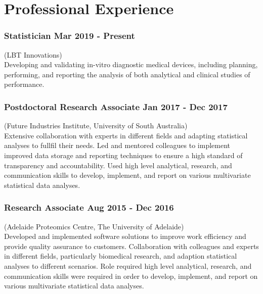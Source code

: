 \documentclass[a4paper,12pt]{report}
\begin{document}
\vspace{1cm}
\section*{Professional Experience}

\subsubsection*{Statistician  \hfill Mar 2019 - Present} \vspace{-6pt}
(LBT Innovations) \\[4pt]

Developing and validating in-vitro diagnostic medical devices, including planning, performing, 
and reporting the analysis of both analytical and clinical studies of performance.

\subsubsection*{Postdoctoral Research Associate  \hfill Jan 2017 - Dec 2017} \vspace{-6pt}
(Future Industries Institute, University of South Australia) \\[4pt]

Extensive collaboration with experts in different fields and adapting statistical
analyses to fullfil their needs. Led and mentored colleagues to implement
improved data storage and reporting techniques to ensure a high standard of transparency
and accountability. Used high level analytical, research, and communication skills to develop, 
implement, and report on various multivariate statistical data analyses.

\subsubsection*{Research Associate  \hfill Aug 2015 - Dec 2016} \vspace{-6pt}
(Adelaide Proteomics Centre, The University of Adelaide) \\[4pt]

Developed and implemented software solutions to improve work efficiency
and provide quality assurance to customers. Collaboration with colleagues and experts
in different fields, particularly biomedical research, and adaption statistical analyses to
different scenarios. Role required high level analytical, research, and communication skills
were required in order to develop, implement, and report on various multivariate statistical
data analyses.
\end{document}
